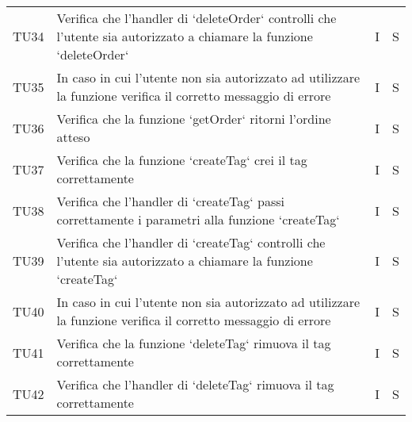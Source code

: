 \begin{center}
\begin{longtable}[!h]{p{45px} p{255px} p{35px} p{35px}}
        TU34          & Verifica che l'handler di `deleteOrder` controlli che l'utente sia autorizzato a chiamare la funzione `deleteOrder`                                                                              & I              & S              \\
        TU35          & In caso in cui l'utente non sia autorizzato ad utilizzare la funzione verifica il corretto messaggio di errore                                                                                   & I              & S              \\
        TU36          & Verifica che la funzione `getOrder` ritorni l'ordine atteso                                                                                                                                      & I              & S              \\
        TU37          & Verifica che la funzione `createTag` crei il tag correttamente                                                                                                                                   & I              & S              \\
        TU38          & Verifica che l'handler di `createTag` passi correttamente i parametri alla funzione `createTag`                                                                                                  & I              & S              \\
        TU39          & Verifica che l'handler di `createTag` controlli che l'utente sia autorizzato a chiamare la funzione `createTag`                                                                                  & I              & S              \\
        TU40          & In caso in cui l'utente non sia autorizzato ad utilizzare la funzione verifica il corretto messaggio di errore                                                                                   & I              & S              \\
        TU41          & Verifica che la funzione `deleteTag` rimuova il tag correttamente                                                                                                                                & I              & S              \\
        TU42          & Verifica che l'handler di `deleteTag` rimuova il tag correttamente                                                                                                                               & I              & S              \\

\end{longtable}
\end{center}
